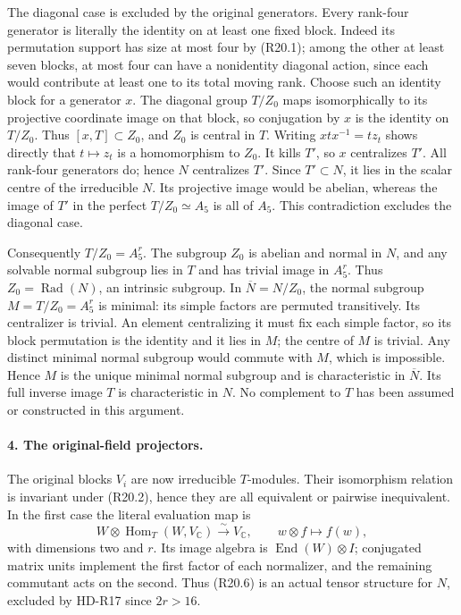 The diagonal case is excluded by the original generators.
Every rank-four generator is literally the identity
on at least one fixed block. Indeed its permutation
support has size at most four by (R20.1); among the
other at least seven blocks, at most four can have a
nonidentity diagonal action, since each would contribute
at least one to its total moving rank. Choose such an
identity block for a generator \(x\).
The diagonal group \(T/Z_0\) maps isomorphically to
its projective coordinate image on that block, so
conjugation by \(x\) is the identity on \(T/Z_0\).
Thus \([x,T]\subset Z_0\), and \(Z_0\) is central
in \(T\). Writing \(xtx^{-1}=tz_t\) shows directly
that \(t\mapsto z_t\) is a homomorphism to \(Z_0\).
It kills \(T'\), so \(x\) centralizes \(T'\).
All rank-four generators do; hence \(N\) centralizes
\(T'\). Since \(T'\subset N\), it lies in the scalar
centre of the irreducible \(N\). Its projective image
would be abelian, whereas the image of \(T'\) in
the perfect \(T/Z_0\simeq A_5\) is all of \(A_5\).
This contradiction excludes the diagonal case.

Consequently \(T/Z_0=A_5^r\). The subgroup \(Z_0\)
is abelian and normal in \(N\), and any solvable
normal subgroup lies in \(T\) and has trivial image
in \(A_5^r\). Thus
\(Z_0=\operatorname{Rad}(N)\), an intrinsic subgroup.
In \(\overline N=N/Z_0\), the normal subgroup
\(M=T/Z_0=A_5^r\) is minimal: its simple factors
are permuted transitively. Its centralizer is trivial.
An element centralizing it must fix each simple factor,
so its block permutation is the identity and it lies
in \(M\); the centre of \(M\) is trivial. Any
distinct minimal normal subgroup would commute with
\(M\), which is impossible. Hence \(M\) is the
unique minimal normal subgroup and is characteristic
in \(\overline N\). Its full inverse image \(T\)
is characteristic in \(N\). No complement to \(T\)
has been assumed or constructed in this argument.

\paragraph{4. The original-field projectors.}
The original blocks \(V_i\) are now irreducible
\(T\)-modules. Their isomorphism relation is invariant
under (R20.2), hence they are all equivalent or
pairwise inequivalent. In the first case the literal
evaluation map is
\[
 W\otimes\operatorname{Hom}_T(W,V_{\mathbb C})
       \xrightarrow{\sim}V_{\mathbb C},\qquad
                     w\otimes f\longmapsto f(w),         \tag{R20.6}
\]
with dimensions two and \(r\). Its image algebra
is \(\operatorname{End}(W)\otimes I\); conjugated
matrix units implement the first factor of each
normalizer, and the remaining commutant acts on
the second. Thus (R20.6) is an actual tensor structure
for \(N\), excluded by HD-R17 since \(2r>16\).

